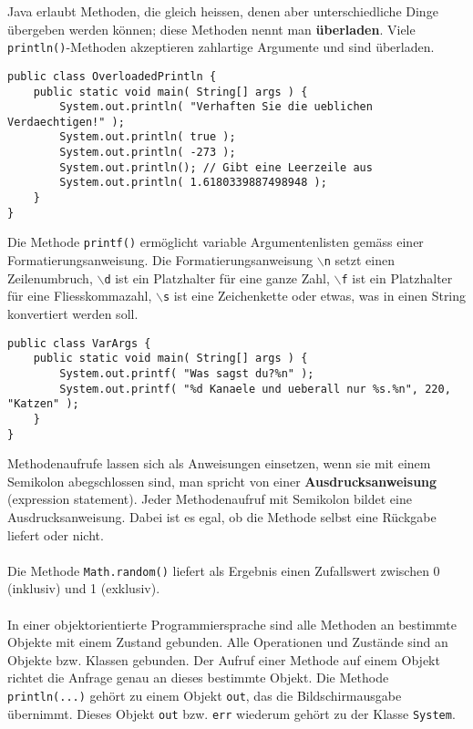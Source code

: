 Java erlaubt Methoden, die gleich heissen, denen aber unterschiedliche Dinge übergeben werden können; diese Methoden nennt man \textbf{überladen}. Viele \texttt{println()}-Methoden akzeptieren zahlartige Argumente und sind überladen. 
\begin{lstlisting}
public class OverloadedPrintln {
    public static void main( String[] args ) {
        System.out.println( "Verhaften Sie die ueblichen Verdaechtigen!" ); 
        System.out.println( true );
        System.out.println( -273 );
        System.out.println(); // Gibt eine Leerzeile aus 
        System.out.println( 1.6180339887498948 );
    } 
}
\end{lstlisting}
Die Methode \texttt{printf()} ermöglicht variable Argumentenlisten gemäss einer Formatierungsanweisung. Die Formatierungsanweisung \texttt{$\backslash$n} setzt einen Zeilenumbruch, \texttt{$\backslash$d} ist ein Platzhalter für eine ganze Zahl, \texttt{$\backslash$f} ist ein Platzhalter für eine Fliesskommazahl, \texttt{$\backslash$s} ist eine Zeichenkette oder etwas, was in einen String konvertiert werden soll.
\begin{lstlisting}
public class VarArgs {
    public static void main( String[] args ) {
        System.out.printf( "Was sagst du?%n" );
        System.out.printf( "%d Kanaele und ueberall nur %s.%n", 220, "Katzen" );
    } 
}
\end{lstlisting}
Methodenaufrufe lassen sich als Anweisungen einsetzen, wenn sie mit einem Semikolon abegschlossen sind, man spricht von einer \textbf{Ausdrucksanweisung} (expression statement). Jeder Methodenaufruf mit Semikolon bildet eine Ausdrucksanweisung. Dabei ist es egal, ob die Methode selbst eine Rückgabe liefert oder nicht.
\\\\
Die Methode \texttt{Math.random()} liefert als Ergebnis einen Zufallswert zwischen 0 (inklusiv) und 1 (exklusiv).
\\\\
In einer objektorientierte Programmiersprache sind alle Methoden an bestimmte Objekte mit einem Zustand gebunden. Alle Operationen und Zustände sind an Objekte bzw. Klassen gebunden. Der Aufruf einer Methode auf einem Objekt richtet die Anfrage genau an dieses bestimmte Objekt. Die Methode \texttt{println(...)} gehört zu einem Objekt \texttt{out}, das die Bildschirmausgabe übernimmt. Dieses Objekt \texttt{out} bzw. \texttt{err} wiederum gehört zu der Klasse \texttt{System}.
\\\\
